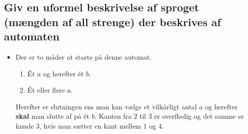 \documentclass[11pt,a4paper]{article}
\begin{document}
\subsection{Giv en uformel beskrivelse af sproget (mængden af all strenge) der beskrives af automaten}
\begin{itemize}
  \item Der er to måder at starte på denne automat.
  \begin{enumerate}
    \item Ét $a$ og herefter ét $b$.
    \item Ét eller flere $a$.
  \end{enumerate}
  Herefter er slutningen ens man kan vælge et vilkårligt antal $a$ og herefter \textbf{skal} man slutte af på ét $b$. Kanten fra $2$ til $3$ er overflødig og det samme er knude $3$, hvis man sætter en kant mellem $1$ og $4$.
\end{itemize}
\end{document}
